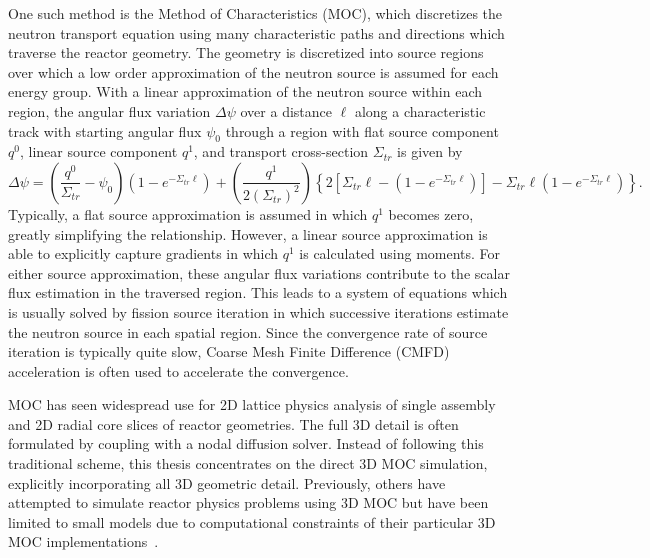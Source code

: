 \documentclass[12pt,twoside]{mitthesis-exec}
\begin{document}

One such method is the Method of Characteristics (MOC), which discretizes the neutron transport equation using many characteristic paths and directions which traverse the reactor geometry. The geometry is discretized into source regions over which a low order approximation of the neutron source is assumed for each energy group. With a linear approximation of the neutron source within each region, the angular flux variation $\Delta \psi$ over a distance $\ell$ along a characteristic track with starting angular flux $\psi_0$ through a region with flat source component $q^0$, linear source component $q^1$, and transport cross-section $\Sigma_{\textit{tr}}$ is given by
\begin{equation*}
\Delta \psi =  \left( \frac{q^0}{\Sigma_{\textit{tr}}} - \psi_0 \right) \left(1 - e^{-\Sigma_{\textit{tr}} \ell} \right) + \left(\frac{q^1}{2\left(\Sigma_{\textit{tr}}\right)^2}\right) \left\lbrace 2 \left[\Sigma_{\textit{tr}} \ell - \left(1 - e^{-\Sigma_{\textit{tr}} \ell} \right)\right] - \Sigma_{\textit{tr}} \ell \left(1 - e^{-\Sigma_{\textit{tr}} \ell} \right) \right\rbrace.
\end{equation*}
Typically, a flat source approximation is assumed in which $q^1$ becomes zero, greatly simplifying the relationship. However, a linear source approximation is able to explicitly capture gradients in which $q^1$ is calculated using moments. For either source approximation, these angular flux variations contribute to the scalar flux estimation in the traversed region. This leads to a system of equations which is usually solved by fission source iteration in which successive iterations estimate the neutron source in each spatial region. Since the convergence rate of source iteration is typically quite slow, Coarse Mesh Finite Difference (CMFD) acceleration is often used to accelerate the convergence.

MOC has seen widespread use for 2D lattice physics analysis of single assembly and 2D radial core slices of reactor geometries. The full 3D detail is often formulated by coupling with a nodal diffusion solver. Instead of following this traditional scheme, this thesis concentrates on the direct 3D MOC simulation, explicitly incorporating all 3D geometric detail. Previously, others have attempted to simulate reactor physics problems using 3D MOC but have been limited to small models due to computational constraints of their particular 3D MOC implementations~\cite{kochunas}.
\end{document}
